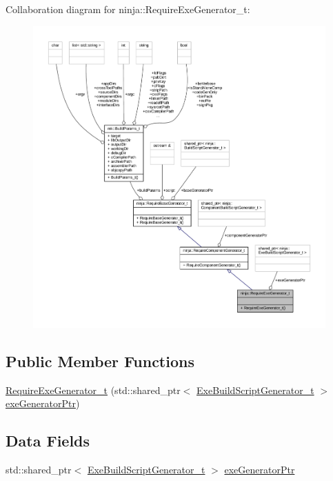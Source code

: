 Collaboration diagram for ninja\+:\+:Require\+Exe\+Generator\+\_\+t\+:
\nopagebreak
\begin{figure}[H]
\begin{center}
\leavevmode
\includegraphics[width=350pt]{structninja_1_1_require_exe_generator__t__coll__graph}
\end{center}
\end{figure}
\subsection*{Public Member Functions}
\begin{DoxyCompactItemize}
\item 
\hyperlink{structninja_1_1_require_exe_generator__t_a9570d97fa97c92ba130bf3b14656fe8c}{Require\+Exe\+Generator\+\_\+t} (std\+::shared\+\_\+ptr$<$ \hyperlink{classninja_1_1_exe_build_script_generator__t}{Exe\+Build\+Script\+Generator\+\_\+t} $>$ \hyperlink{structninja_1_1_require_exe_generator__t_a2fc1256089c9c0afb7b160085fecc749}{exe\+Generator\+Ptr})
\end{DoxyCompactItemize}
\subsection*{Data Fields}
\begin{DoxyCompactItemize}
\item 
std\+::shared\+\_\+ptr$<$ \hyperlink{classninja_1_1_exe_build_script_generator__t}{Exe\+Build\+Script\+Generator\+\_\+t} $>$ \hyperlink{structninja_1_1_require_exe_generator__t_a2fc1256089c9c0afb7b160085fecc749}{exe\+Generator\+Ptr}
\end{DoxyCompactItemize}


